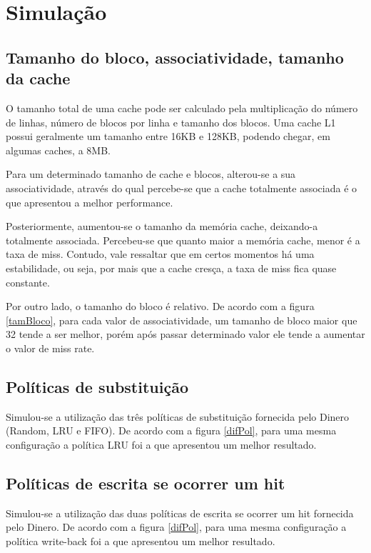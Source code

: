 \documentclass[10pt,a4paper]{article}
\begin{document}
\section{Simulação}

\subsection{Tamanho do bloco, associatividade, tamanho da cache}
\label{sec1}
O tamanho total de uma cache pode ser calculado pela multiplicação do
número de linhas, número de blocos por linha e tamanho dos blocos.
Uma cache L1 possui geralmente um tamanho entre 16KB e 128KB, podendo chegar, em algumas caches, a 8MB.

Para um determinado tamanho de cache e blocos, alterou-se a sua
associatividade, através do qual percebe-se que a cache totalmente associada é o que
apresentou a melhor performance.

Posteriormente, aumentou-se o tamanho da memória cache, deixando-a totalmente associada.
Percebeu-se que quanto maior a memória cache, menor é a taxa de miss. Contudo, vale ressaltar que
em certos momentos há uma estabilidade, ou seja, por mais que a cache cresça, a taxa de miss fica quase
constante.

Por outro lado, o tamanho do bloco é relativo. De acordo com a figura \ref{tamBloco}, para cada valor de associatividade, um tamanho de bloco maior que 32
tende a ser melhor, porém após passar determinado valor ele tende a aumentar o valor de miss rate.

\subsection{Políticas de substituição}
Simulou-se a utilização das três políticas de substituição fornecida
pelo Dinero (Random, LRU e FIFO).
De acordo com a figura \ref{difPol}, para uma mesma configuração a política LRU foi a que apresentou um
melhor resultado.

\subsection{Políticas de escrita se ocorrer um hit}
Simulou-se a utilização das duas políticas de escrita se ocorrer um
hit fornecida pelo Dinero.
De acordo com a figura \ref{difPol}, para uma mesma configuração a política write-back foi a que apresentou um
melhor resultado.
\end{document}
